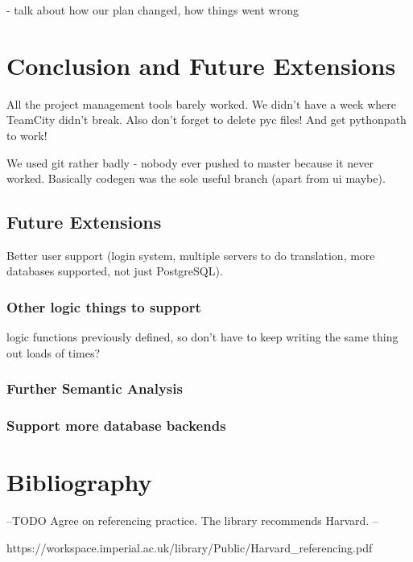 \documentclass[a4paper, 11pt]{article}
\begin{document}
  - talk about how our plan changed, how things went wrong

\section{Conclusion and Future Extensions}

  All the project management tools barely worked. We didn't have a week where
  TeamCity didn't break. Also don't forget to delete pyc files! And get
  pythonpath to work!

  We used git rather badly - nobody ever pushed to master because it never
  worked. Basically codegen was the sole useful branch (apart from ui maybe).

  \subsection{Future Extensions}
    Better user support (login system, multiple servers to do translation,
    more databases supported, not just PostgreSQL).

    \subsubsection{Other logic things to support}
    logic functions previously defined, so don't have to keep writing the same
    thing out loads of times?

    \subsubsection{Further Semantic Analysis}

    \subsubsection{Support more database backends} 

\section{Bibliography}
  \printbibliography

  --TODO Agree on referencing practice. The library recommends Harvard. --

  https://workspace.imperial.ac.uk/library/Public/Harvard\_referencing.pdf
\end{document}
